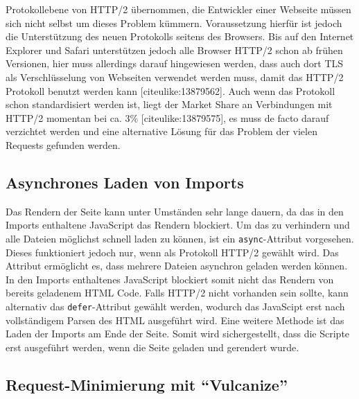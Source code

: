 Protokollebene von HTTP/2 übernommen, die Entwickler einer Webseite
müssen sich nicht selbst um dieses Problem kümmern. Voraussetzung
hierfür ist jedoch die Unterstützung des neuen Protokolls seitens des
Browsers. Bis auf den Internet Explorer und Safari unterstützen jedoch
alle Browser HTTP/2 schon ab frühen Versionen, hier muss allerdings
darauf hingewiesen werden, dass auch dort TLS als Verschlüsselung von
Webseiten verwendet werden muss, damit das HTTP/2 Protokoll benutzt
werden kann {[}citeulike:13879562{]}. Auch wenn das Protokoll schon
standardisiert werden ist, liegt der Market Share an Verbindungen mit
HTTP/2 momentan bei ca. 3\% {[}citeulike:13879575{]}, es muss de facto
darauf verzichtet werden und eine alternative Lösung für das Problem der
vielen Requests gefunden werden.

\subsection{Asynchrones Laden von
Imports}\label{asynchrones-laden-von-imports}

Das Rendern der Seite kann unter Umständen sehr lange dauern, da das in
den Imports enthaltene JavaScript das Rendern blockiert. Um das zu
verhindern und alle Dateien möglichst schnell laden zu können, ist ein
\texttt{async}-Attribut vorgesehen. Dieses funktioniert jedoch nur, wenn
als Protokoll HTTP/2 gewählt wird. Das Attribut ermöglicht es, dass
mehrere Dateien asynchron geladen werden können. In den Imports
enthaltenes JavaScript blockiert somit nicht das Rendern von bereits
geladenem HTML Code. Falls HTTP/2 nicht vorhanden sein sollte, kann
alternativ das \texttt{defer}-Attribut gewählt werden, wodurch das
JavaScipt erst nach vollständigem Parsen des HTML ausgeführt wird. Eine
weitere Methode ist das Laden der Imports am Ende der Seite. Somit wird
sichergestellt, dass die Scripte erst ausgeführt werden, wenn die Seite
geladen und gerendert wurde.

\subsection{\texorpdfstring{Request-Minimierung mit
``Vulcanize''}{Request-Minimierung mit Vulcanize}}\label{request-minimierung-mit-vulcanize}

